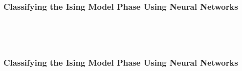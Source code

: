\documentclass[11pt]{article}
\begin{document}
    \begin{center}
    \end{center}
    { \hspace*{\fill} \\}

\newpage
\hypertarget{classifying-the-ising-model-phase-using-neural-networks}{%
\subsubsection{Classifying the Ising Model Phase Using Neural
Networks}\label{classifying-the-ising-model-phase-using-neural-networks}}

    \begin{center}
    \end{center}
    
    \begin{center}
    \end{center}
    { \hspace*{\fill} \\}
    
    \begin{center}
    \end{center}
    { \hspace*{\fill} \\}

\newpage
\hypertarget{classifying-the-ising-model-phase-using-neural-networks}{%
\subsubsection{Classifying the Ising Model Phase Using Neural
Networks}\label{classifying-the-ising-model-phase-using-neural-networks2}}

    \begin{center}
    \end{center}
    
    \begin{center}
    \end{center}
    { \hspace*{\fill} \\}
    
    \begin{center}
    \end{center}
    { \hspace*{\fill} \\}
    
\end{document}
